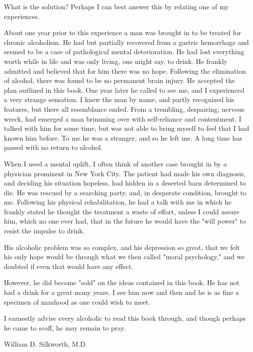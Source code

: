 \begin{biblechapter}
    What is the solution? 
\verse Perhaps I can best answer this by relating one of my experiences.

\verse About one year prior to this experience 
    a man was brought in to be treated for chronic alcoholism. 
\verse He had but partially recovered from a gastric hemorrhage 
    and seemed to be a case of pathological mental deterioration. 
\verse He had lost everything worth while in life 
    and was only living, one might say, to drink. 
\verse He frankly admitted and believed that for him there was no hope. 
\verse Following the elimination of alcohol, there was found to be no permanent brain injury. 
\verse He accepted the plan outlined in this book. 
\verse One year later he called to see me, and I experienced a very strange sensation. 
\verse I knew the man by name, and partly recognized his features, 
    but there all resemblance ended. 
\verse From a trembling, despairing, nervous wreck, 
    had emerged a man brimming over with self-reliance and contentment. 
\verse I talked with him for some time, 
    but was not able to bring myself to feel that I had known him before. 
\verse To me he was a stranger, and so he left me. 
\verse A long time has passed with no return to alcohol.

\verse When I need a mental uplift, 
    I often think of another case brought in by a physician prominent in New York City. 
\verse The patient had made his own diagnosis, 
    and deciding his situation hopeless, 
    had hidden in a deserted barn determined to die. 
\verse He was rescued by a searching party, 
    and, in desperate condition, brought to me. 
\verse Following his physical rehabilitation, 
    he had a talk with me in which he frankly stated he thought the treatment a waste of effort, 
    unless I could assure him, which no one ever had, 
    that in the future he would have the "will power" to resist the impulse to drink.

\verse His alcoholic problem was so complex, 
    and his depression so great, 
    that we felt his only hope would be through what we then called "moral psychology," 
    and we doubted if even that would have any effect.

\verse However, he did become "sold" on the ideas contained in this book. 
\verse He has not had a drink for a great many years. 
\verse I see him now and then and he is as fine a specimen of manhood as one could wish to meet.

\verse I earnestly advise every alcoholic to read this book through, 
    and though perhaps he came to scoff, 
    he may remain to pray.

\verse William D. Silkworth, M.D.
\end{biblechapter}

